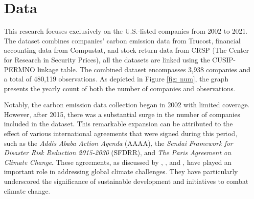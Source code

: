 \documentclass[12pt]{article}
\begin{document}
\clearpage
%
%
\section{Data} \label{sec:data}
This research focuses exclusively on the U.S.-listed companies from 2002 to 2021. The dataset combines companies' carbon emission data from Trucost, financial accounting data from Compustat, and stock return data from CRSP (The Center for Research in Security Prices), all the datasets are linked using the CUSIP-PERMNO linkage table. The combined dataset encompasses 3,938 companies and a total of 480,119 observations. As depicted in Figure \ref{fig: num}, the graph presents the yearly count of both the number of companies and observations.

Notably, the carbon emission data collection began in 2002 with limited coverage. However, after 2015, there was a substantial surge in the number of companies included in the dataset. This remarkable expansion can be attributed to the effect of various international agreements that were signed during this period, such as the \textit{Addis Ababa Action Agenda} (AAAA), the \textit{Sendai Framework for Disaster Risk Reduction 2015-2030} (SFDRR), and \textit{The Paris Agreement on Climate Change}. These agreements, as discussed by \cite{engberg2021influence}, \cite{kelman2015climate}, and \cite{dimitrov2016paris}, have played an important role in addressing global climate challenges. They have particularly underscored the significance of sustainable development and initiatives to combat climate change.
\end{document}
